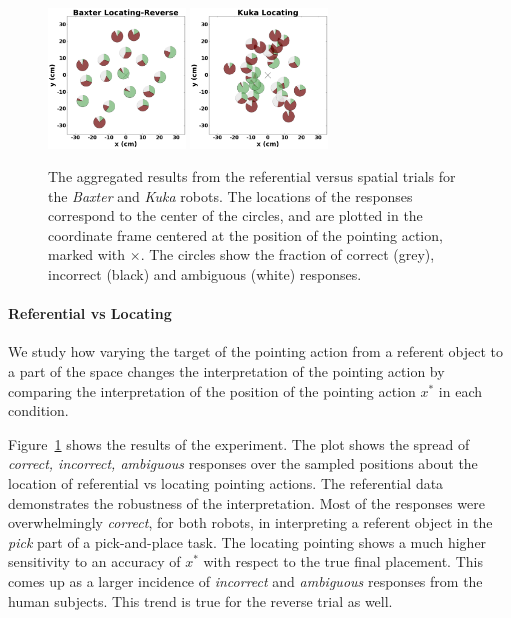 \begin{figure}[ht!]
    \includegraphics[width=0.325\textwidth ]{figures/baxter_Locating-Reverse_.png}
    \includegraphics[width=0.325\textwidth ]{figures/kuka_Locating_.png}
    \caption{The aggregated results from the referential versus spatial trials for the \textit{Baxter} and \textit{Kuka} robots. The locations of the responses correspond to the center of the circles, and are plotted in the coordinate frame centered at the position of the pointing action, marked with $\times$. The circles show the fraction of correct (grey), incorrect (black) and ambiguous (white) responses.}
    \label{fig:aggregatesimple}
\end{figure}

\paragraph{Referential vs Locating}
We study how varying the target of the pointing action from a referent object to a part of the space changes the interpretation of the pointing action by comparing the interpretation of the position of the pointing action $x^*$ in each condition. 

Figure~\ref{fig:aggregatesimple} shows the results of the experiment. The plot shows the spread of \textit{correct, incorrect, ambiguous} responses over the sampled positions about the location of referential vs locating pointing actions. The referential data demonstrates the robustness of the interpretation. Most of the responses were overwhelmingly \textit{correct}, for both robots, in interpreting a referent object in the \textit{pick} part of a pick-and-place task. The locating pointing shows a much higher sensitivity to an accuracy of $x^*$ with respect to the true final placement. This comes up as a larger incidence of \textit{incorrect} and \textit{ambiguous} responses from the human subjects. This trend is true for the reverse trial as well.

